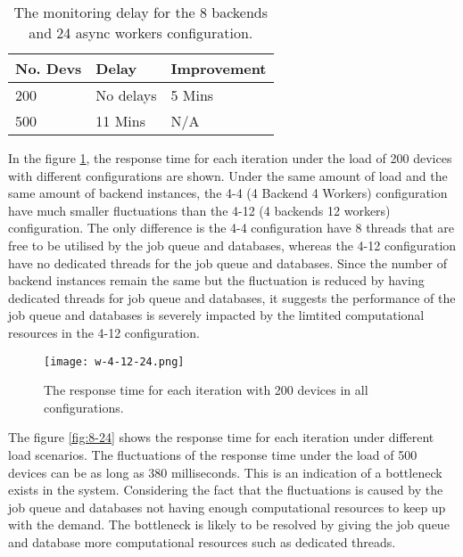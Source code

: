 \documentclass[../thesis.tex]{subfiles}
\begin{document}
\begin{table}[h!]
	\begin{center}
		\caption{The monitoring delay for the 8 backends and 24 async workers configuration.}
		\label{tab:delay8-24}
		\begin{tabular}{l|l|l}
			\toprule
			\textbf{No. Devs} & \textbf{Delay} & \textbf{Improvement}\\
			\midrule
			200 & No delays & 5 Mins	\\
			500 & 11 Mins & N/A\\
			\bottomrule
		\end{tabular}
	\end{center}
\end{table}



In the figure \ref{fig:w-4-12-24}, the response time for each iteration under the load of 200 devices with different configurations are shown. Under the same amount of load and the same amount of backend instances, the 4-4 (4 Backend 4 Workers) configuration have much smaller fluctuations than the 4-12 (4 backends 12 workers) configuration. The only difference is the 4-4 configuration have 8 threads that are free to be utilised by the job queue and databases, whereas the 4-12 configuration have no dedicated threads for the job queue and databases. Since the number of backend instances remain the same but the fluctuation is reduced by having dedicated threads for job queue and databases, it suggests the performance of the job queue and databases is severely impacted by the limtited computational resources in the 4-12 configuration. 

\begin{figure}[!ht]
	\centering
	\texttt{[image: w-4-12-24.png]}
	\caption{The response time for each iteration with 200 devices in all configurations.}
	\label{fig:w-4-12-24}
\end{figure}


The figure \ref{fig:8-24} shows the response time for each iteration under different load scenarios. The fluctuations of the response time under the load of 500 devices can be as long as 380 milliseconds. This is an indication of a bottleneck exists in the system. Considering the fact that the fluctuations is caused by the job queue and databases not having enough computational resources to keep up with the demand. The bottleneck is likely to be resolved by giving the job queue and database more computational resources such as dedicated threads.
\end{document}
